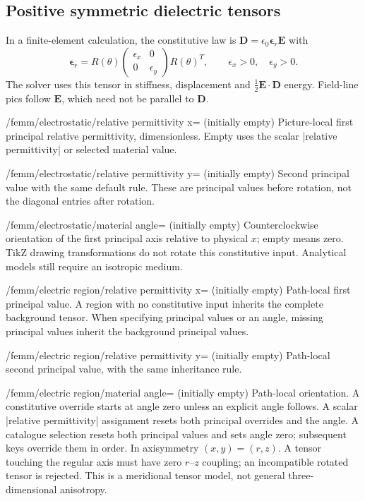 \subsection{Positive symmetric dielectric tensors}
In a finite-element calculation, the constitutive law is
$\mathbf D=\epsilon_0\boldsymbol\epsilon_r\mathbf E$ with
\[
 \boldsymbol\epsilon_r=R(\theta)
 \begin{pmatrix}\epsilon_x&0\\0&\epsilon_y\end{pmatrix}R(\theta)^T,
 \qquad \epsilon_x>0,\quad\epsilon_y>0.
\]
The solver uses this tensor in stiffness, displacement and
$\tfrac12\mathbf E\mathbin\cdot\mathbf D$ energy. Field-line pics follow
$\mathbf E$, which need not be parallel to $\mathbf D$.
\begin{key}{/femm/electrostatic/relative permittivity x= (initially empty)}
Picture-local first principal relative permittivity, dimensionless.
Empty uses the scalar |relative permittivity| or selected material value.
\end{key}
\begin{key}{/femm/electrostatic/relative permittivity y= (initially empty)}
Second principal value with the same default rule. These are principal values
before rotation, not the diagonal entries after rotation.
\end{key}
\begin{key}{/femm/electrostatic/material angle= (initially empty)}
Counterclockwise orientation of the first principal axis relative to physical
$x$; empty means zero. TikZ drawing transformations do not rotate this
constitutive input. Analytical models still require an isotropic medium.
\end{key}
\begin{key}{/femm/electric region/relative permittivity x= (initially empty)}
Path-local first principal value. A region with no constitutive input inherits
the complete background tensor. When specifying principal values or an angle,
missing principal values inherit the background principal values.
\end{key}
\begin{key}{/femm/electric region/relative permittivity y= (initially empty)}
Path-local second principal value, with the same inheritance rule.
\end{key}
\begin{key}{/femm/electric region/material angle= (initially empty)}
Path-local orientation. A constitutive override starts at angle zero unless
an explicit angle follows. A scalar |relative permittivity| assignment resets
both principal overrides and the angle. A catalogue selection resets both
principal values and sets angle zero; subsequent keys override them in order.
In axisymmetry $(x,y)=(r,z)$. A tensor touching the regular axis must have zero
$r$--$z$ coupling; an incompatible rotated tensor is rejected. This is a
meridional tensor model, not general three-dimensional anisotropy.
\end{key}

